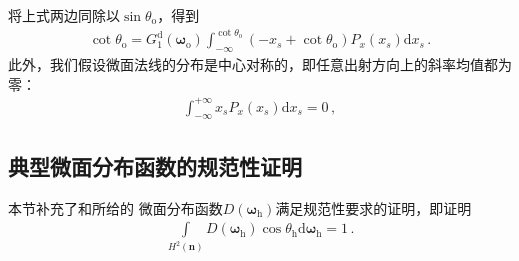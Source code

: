 将上式两边同除以$\sin\theta_{\mathrm{o}}$，得到
\begin{align}
    \cot\theta_{\mathrm{o}}=G_1^{\mathrm{d}}({\bm\omega}_{\mathrm{o}})
    \int_{-\infty}^{\cot\theta_{\mathrm{o}}}
    (-x_s+\cot\theta_{\mathrm{o}})P_x(x_s)\mathrm{d}x_s\, .
\end{align}
此外，我们假设微面法线的分布是中心对称的，即任意出射方向上的斜率均值都为零：
\begin{align}
    \int_{-\infty}^{+\infty}x_sP_{x}(x_s)\mathrm{d}x_s=0\, ,
\end{align}

\subsection{典型微面分布函数的规范性证明}\label{sub:典型微面分布函数的规范性证明}
本节补充了和所给的
微面分布函数$D({\bm\omega}_{\mathrm{h}})$满足规范性要求的证明，即证明
\begin{align}\label{eq:8.ex-01}
    \int\limits_{H^2({\bm n})}D({\bm\omega}_{\mathrm{h}})\cos\theta_{\mathrm{h}}\mathrm{d}{\bm\omega}_{\mathrm{h}}=1\, .
\end{align}

